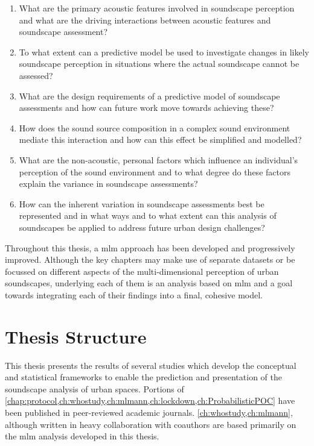 \begin{enumerate}
  \item What are the primary acoustic features involved in soundscape perception and what are the driving interactions between acoustic features and soundscape assessment?
  \item To what extent can a predictive model be used to investigate changes in likely soundscape perception in situations where the actual soundscape cannot be assessed?
  \item What are the design requirements of a predictive model of soundscape assessments and how can future work move towards achieving these?
  \item How does the sound source composition in a complex sound environment mediate this interaction and how can this effect be simplified and modelled?
  \item What are the non-acoustic, personal factors which influence an individual's perception of the sound environment and to what degree do these factors explain the variance in soundscape assessments? 
  \item How can the inherent variation in soundscape assessments best be represented and in what ways and to what extent can this analysis of soundscapes be applied to address future urban design challenges? 
\end{enumerate}

Throughout this thesis, a \gls{mlm} approach has been developed and progressively improved. Although the key chapters may make use of separate datasets or be focussed on different aspects of the multi-dimensional perception of urban soundscapes, underlying each of them is an analysis based on \gls{mlm} and a goal towards integrating each of their findings into a final, cohesive model.


\section{Thesis Structure}

This thesis presents the results of several studies which develop the conceptual and statistical frameworks to enable the prediction and presentation of the soundscape analysis of urban spaces. Portions of \cref{chap:protocol,ch:whostudy,ch:mlmann,ch:lockdown,ch:ProbabilisticPOC} have been published in peer-reviewed academic journals. \cref{ch:whostudy,ch:mlmann}, although written in heavy collaboration with coauthors are based primarily on the \gls{mlm} analysis developed in this thesis.

